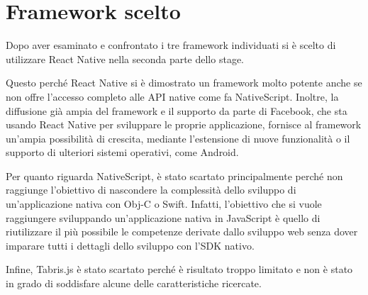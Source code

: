 \FloatBarrier
\section{Framework scelto}

Dopo aver esaminato e confrontato i tre framework individuati si è scelto di utilizzare React Native nella seconda parte dello stage.

Questo perché React Native si è dimostrato un framework molto potente anche se non offre l'accesso completo alle API native come fa NativeScript.
Inoltre, la diffusione già ampia del framework e il supporto da parte di Facebook, che sta usando React Native per sviluppare le proprie applicazione, fornisce al framework un'ampia possibilità di crescita, mediante l'estensione di nuove funzionalità o il supporto di ulteriori sistemi operativi, come Android.

Per quanto riguarda NativeScript, è stato scartato principalmente perché non raggiunge l'obiettivo di nascondere la complessità dello sviluppo di un'applicazione nativa con Obj-C o Swift.
Infatti, l'obiettivo che si vuole raggiungere sviluppando un'applicazione nativa in JavaScript è quello di riutilizzare il più possibile le competenze derivate dallo sviluppo web senza dover imparare tutti i dettagli dello sviluppo con l'SDK nativo.

Infine, Tabris.js è stato scartato perché è risultato troppo limitato e non è stato in grado di soddisfare alcune delle caratteristiche ricercate.




